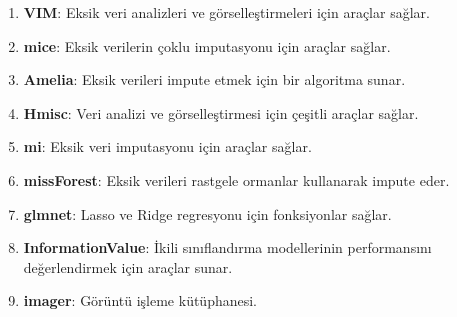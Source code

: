 \begin{enumerate}
    \item \textbf{VIM}: Eksik veri analizleri ve görselleştirmeleri için araçlar sağlar.
    \item \textbf{mice}: Eksik verilerin çoklu imputasyonu için araçlar sağlar.
    \item \textbf{Amelia}: Eksik verileri impute etmek için bir algoritma sunar.
    \item \textbf{Hmisc}: Veri analizi ve görselleştirmesi için çeşitli araçlar sağlar.
    \item \textbf{mi}: Eksik veri imputasyonu için araçlar sağlar.
    \item \textbf{missForest}: Eksik verileri rastgele ormanlar kullanarak impute eder.
    \item \textbf{glmnet}: Lasso ve Ridge regresyonu için fonksiyonlar sağlar.
    \item \textbf{InformationValue}: İkili sınıflandırma modellerinin performansını değerlendirmek için araçlar sunar.
    \item \textbf{imager}: Görüntü işleme kütüphanesi.
\end{enumerate}

\newpage